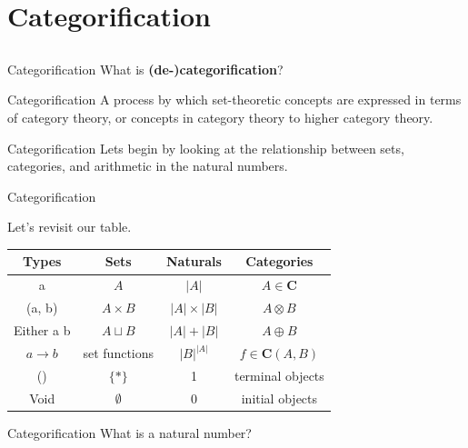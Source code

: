 \documentclass[tikz]{beamer}
\theoremstyle{definition}
\newcommand{\cat}[1]{\mathbf{#1}}
\begin{document}
\section{Categorification}
\subsection{}

\begin{frame}{Categorification}
    What is \textbf{(de-)categorification}?

\end{frame}

\begin{frame}{Categorification}
A process by which set-theoretic concepts are expressed in terms of category theory, or concepts in category theory to higher category theory.

\end{frame}

\begin{frame}{Categorification}
    Lets begin by looking at the relationship between sets, categories, and arithmetic in the natural numbers.
\end{frame}{}

\begin{frame}{Categorification}

Let's revisit our table.


\begin{center}
\begin{tabular}{|c|c|c|c|}
\hline
Types & Sets & Naturals & Categories \\
\hline
a       & $A$ & $|A|$  & $A \in \cat{C}$ \\
(a, b) & $A \times B$ & $|A| \times |B|$ & $A \otimes B$ \\
Either a b & $A \sqcup B$ & $|A| + |B|$ & $A \oplus B$ \\
$a \to b$ &  set functions & $|B|^{|A|}$ & $f \in \cat{C}(A, B)$ \\
() & $\{*\}$ & 1 & terminal objects \\
Void & $\emptyset$ & 0 & initial objects \\ \hline
\end{tabular}
\end{center}

\end{frame}

\begin{frame}{Categorification}
    What is a natural number?
\end{frame}
\end{document}
